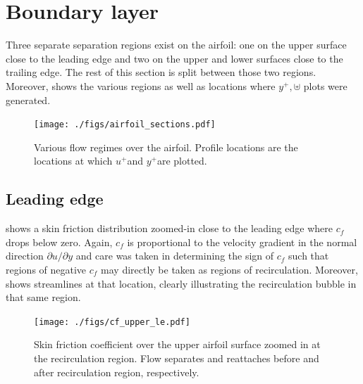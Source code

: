 \newcommand{\yplus}{\ensuremath{y^+}}
\newcommand{\uplu}{\ensuremath{u^+}}
\section{Boundary layer}
\label{sec:bl}
Three separate separation regions exist on the airfoil: one on the upper surface
close to the leading edge and two on the upper and lower surfaces close to the
trailing edge. The rest of this section is split between those two regions. Moreover,
 shows the various regions as well as locations where
$\yplus,\uplus$ plots were generated.

\begin{figure}
    \centering
    \texttt{[image: ./figs/airfoil\_sections.pdf]}
    \caption{Various flow regimes over the airfoil. Profile locations are the locations
        at which \uplu and \yplus are plotted.}\label{fig:airfoil_sections}
\end{figure}

\subsection{Leading edge}
 shows a skin friction distribution zoomed-in close to the leading
edge where $c_f$ drops below zero. Again, $c_f$ is proportional to the velocity gradient
in the normal direction $\partial u/\partial y$ and care was taken in determining the sign
of $c_f$ such that regions of negative $c_f$ may directly be taken as regions of
recirculation. Moreover,  shows
streamlines at that location, clearly illustrating the recirculation bubble in that
same region.

\begin{figure}
    \centering
    \texttt{[image: ./figs/cf\_upper\_le.pdf]}
    \caption{Skin friction coefficient over the upper airfoil surface zoomed in
        at the recirculation region. Flow separates and reattaches before
        and after recirculation region, respectively.}\label{fig:cf_upper_le}
\end{figure}

